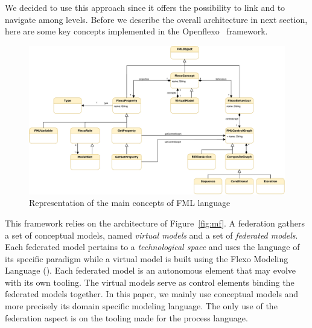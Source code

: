 We decided to use this approach since it offers the possibility to
link and to navigate among levels. Before we describe the overall
architecture in next section, here are some key concepts implemented
in the Openflexo~\parencite{openflexo_link} framework.



\begin{figure}
    \centering
    \includegraphics[width=1.0 \textwidth]{Figures/FMLMetaModel.pdf}
    \caption{Representation of the main concepts of {FML} language}
    \label{fig:mm}
\end{figure}

This framework relies on the architecture of Figure~\ref{fig:mf}. A federation
gathers a set of conceptual models, named \emph{virtual models} and a
set of \emph{federated models}. Each federated model pertains to a
\emph{technological space} and uses the language of its specific
paradigm while a virtual model is built using the Flexo Modeling
Language (\FML). Each federated model is an autonomous
element that may evolve with its own tooling. The virtual models
serve as control elements binding the federated models together.
In this paper, we mainly use conceptual models and more precisely \FML its domain specific modeling language. The only use of the federation aspect is on the tooling made for the process language.

